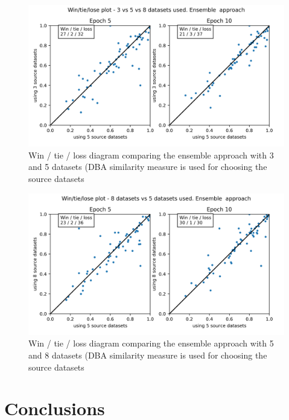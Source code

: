 \documentclass[a4paper,11pt,twoside]{report}
\theoremstyle{definition}
\begin{document}
\FloatBarrier
\begin{figure}[h!t]
\centering
\includegraphics[width=17cm]{imgs/ensemble_dba_3_vs_5/win_tie_lose_epoch.png}
\caption{Win / tie / loss diagram comparing the ensemble approach with 3 and 5 datasets (DBA similarity measure is used for choosing the source datasets}
\label{fig:ensemble_3_5_win_tie_loss}
\end{figure}
\FloatBarrier
\begin{figure}[h!t]
\centering
\includegraphics[width=17cm]{imgs/ensemble_dba_5_vs_8/win_tie_lose_epoch.png}
\caption{Win / tie / loss diagram comparing the ensemble approach with 5 and 8 datasets (DBA similarity measure is used for choosing the source datasets}
\label{fig:ensemble_5_8_win_tie_loss}
\end{figure}
\FloatBarrier
\chapter{Conclusions}
\end{document}
